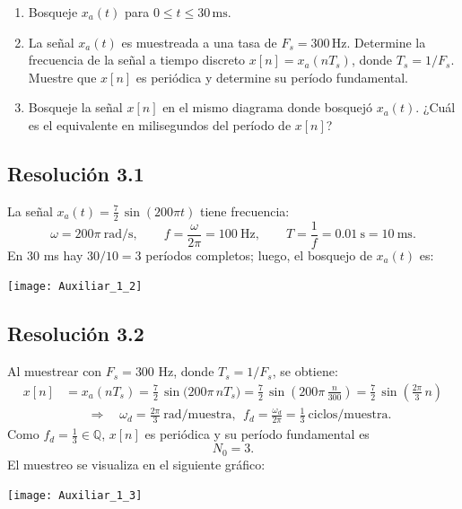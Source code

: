 \documentclass[
  11pt,
  letterpaper,
   addpoints,
   answers
  ]{exam}
\begin{document}
\begin{questions}
\begin{enumerate}
  \item Bosqueje \(x_a(t)\) para \(0 \le t \le 30\,\text{ms}\).
  \item La señal \(x_a(t)\) es muestreada a una tasa de \(F_s=300\,\text{Hz}\).
        Determine la frecuencia de la señal a tiempo discreto \(x[n]=x_a(nT_s)\),
        donde \(T_s = 1/F_s\). 
        Muestre que \(x[n]\) es periódica y determine su período fundamental.
  \item Bosqueje la señal \(x[n]\) en el mismo diagrama donde bosquejó \(x_a(t)\).
        ¿Cuál es el equivalente en milisegundos del período de \(x[n]\)?
\end{enumerate}

\begin{solution}

\subsection*{Resolución 3.1}
La señal $x_a(t)=\frac{7}{2}\,\sin(200\pi t)$ tiene frecuencia:
\begin{equation}
\omega = 200\pi\ \text{rad/s}, \qquad f=\frac{\omega}{2\pi}=100\ \text{Hz},
\qquad T=\frac{1}{f}=0.01\ \text{s} = 10\ \text{ms}.
\end{equation}
En \(30\) ms hay \(30/10=3\) períodos completos; luego, el bosquejo de \(x_a(t)\) es:
\begin{center}
  \texttt{[image: Auxiliar\_1\_2]}
\end{center}
\subsection*{Resolución 3.2}
Al muestrear con \(F_s=300\) Hz, donde \(T_s=1/F_s\), se obtiene:
\begin{align}
x[n] &= x_a(nT_s)
  =\frac{7}{2}\,\sin\!\big(200\pi\,nT_s\big)
  =\frac{7}{2}\,\sin\!\left(200\pi\,\frac{n}{300}\right) 
  = \frac{7}{2}\,\sin\!\left(\frac{2\pi}{3}\,n\right)
\end{align}
\begin{align}
  \quad\Rightarrow\quad
  \omega_d=\frac{2\pi}{3}\ \text{rad/muestra},\ \ 
  f_d=\frac{\omega_d}{2\pi}=\frac{1}{3}\ \text{ciclos/muestra}.
\end{align}
Como \(f_d=\tfrac{1}{3}\in\mathbb{Q}\), \(x[n]\) es periódica y su período fundamental es
\begin{equation}
N_0=3.
\end{equation}
El muestreo se visualiza en el siguiente gráfico:
\begin{center}
  \texttt{[image: Auxiliar\_1\_3]}
\end{center}

\end{solution}
\end{questions}
\end{document}
